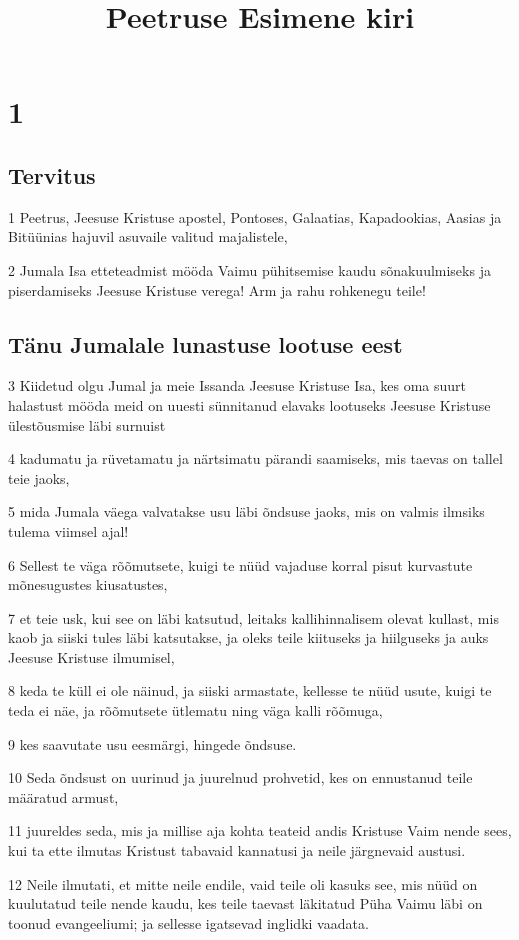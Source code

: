 

\title{Peetruse Esimene kiri}

\chapter{1}

\section*{Tervitus}

\par 1 Peetrus, Jeesuse Kristuse apostel, Pontoses, Galaatias, Kapadookias, Aasias ja Bitüünias hajuvil asuvaile valitud majalistele,
\par 2 Jumala Isa etteteadmist mööda Vaimu pühitsemise kaudu sõnakuulmiseks ja piserdamiseks Jeesuse Kristuse verega! Arm ja rahu rohkenegu teile!

\section*{Tänu Jumalale lunastuse lootuse eest}

\par 3 Kiidetud olgu Jumal ja meie Issanda Jeesuse Kristuse Isa, kes oma suurt halastust mööda meid on uuesti sünnitanud elavaks lootuseks Jeesuse Kristuse ülestõusmise läbi surnuist
\par 4 kadumatu ja rüvetamatu ja närtsimatu pärandi saamiseks, mis taevas on tallel teie jaoks,
\par 5 mida Jumala väega valvatakse usu läbi õndsuse jaoks, mis on valmis ilmsiks tulema viimsel ajal!
\par 6 Sellest te väga rõõmutsete, kuigi te nüüd vajaduse korral pisut kurvastute mõnesugustes kiusatustes,
\par 7 et teie usk, kui see on läbi katsutud, leitaks kallihinnalisem olevat kullast, mis kaob ja siiski tules läbi katsutakse, ja oleks teile kiituseks ja hiilguseks ja auks Jeesuse Kristuse ilmumisel,
\par 8 keda te küll ei ole näinud, ja siiski armastate, kellesse te nüüd usute, kuigi te teda ei näe, ja rõõmutsete ütlematu ning väga kalli rõõmuga,
\par 9 kes saavutate usu eesmärgi, hingede õndsuse.
\par 10 Seda õndsust on uurinud ja juurelnud prohvetid, kes on ennustanud teile määratud armust,
\par 11 juureldes seda, mis ja millise aja kohta teateid andis Kristuse Vaim nende sees, kui ta ette ilmutas Kristust tabavaid kannatusi ja neile järgnevaid austusi.
\par 12 Neile ilmutati, et mitte neile endile, vaid teile oli kasuks see, mis nüüd on kuulutatud teile nende kaudu, kes teile taevast läkitatud Püha Vaimu läbi on toonud evangeeliumi; ja sellesse igatsevad inglidki vaadata.

